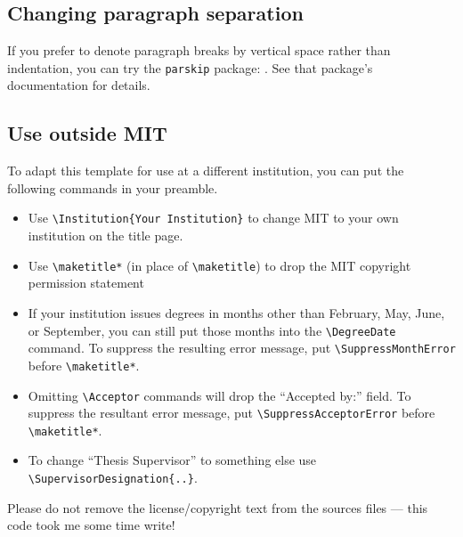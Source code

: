 \documentclass[11pt]{article}
\begin{document}
\subsection{Changing paragraph separation}
If you prefer to denote paragraph breaks by vertical space rather than indentation, you can try the \texttt{parskip} package: . See that package's documentation for details.

\subsection{Use outside MIT}
To adapt this template for use at a different institution, you can put the following commands in your preamble.  
\begin{itemize}
\item Use \verb|\Institution{Your Institution}| to change MIT to your own institution on the title page.

\item Use \verb|\maketitle*| (in place of \verb|\maketitle|) to drop the MIT copyright permission statement

\item If your institution issues degrees in months other than February, May, June, or September, you can still put those months into the 
\verb|\DegreeDate| command. To suppress the resulting error message, put \verb|\SuppressMonthError| before \verb|\maketitle*|. 

\item Omitting \verb|\Acceptor| commands will drop the ``Accepted by:'' field. To suppress the resultant error message, put \verb|\SuppressAcceptorError| before \verb|\maketitle*|.

\item To change ``Thesis Supervisor'' to something else use \verb|\SupervisorDesignation{..}|.
\end{itemize}
Please do not remove the license/copyright text from the sources files --- this code took me some time write!
\end{document}
